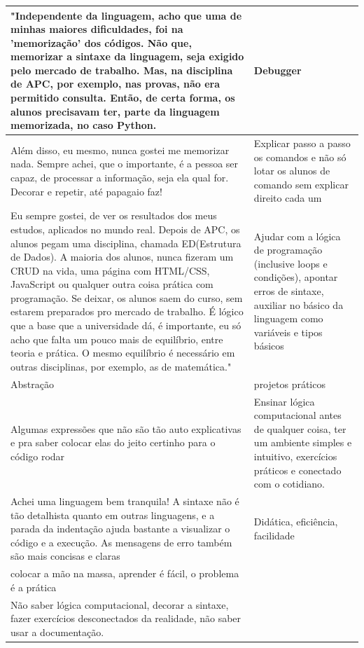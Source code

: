 \begin{longtable}{| p{} | p{} |}
    "Independente da linguagem, acho que uma de minhas maiores dificuldades, foi na 'memorização' dos códigos. Não que, memorizar a sintaxe da linguagem, seja exigido pelo mercado de trabalho. Mas, na disciplina de APC, por exemplo, nas provas, não era permitido consulta. Então, de certa forma, os alunos precisavam ter, parte da linguagem memorizada, no caso Python. & Debugger \\ \hline
    Além disso, eu mesmo, nunca gostei me memorizar nada. Sempre achei, que o importante, é a pessoa ser capaz, de processar a informação, seja ela qual for. Decorar e repetir, até papagaio faz! & Explicar passo a passo os comandos e não só lotar os alunos de comando sem explicar direito cada um \\ \hline
    Eu sempre gostei, de ver os resultados dos meus estudos, aplicados no mundo real. Depois de APC, os alunos pegam uma disciplina, chamada ED(Estrutura de Dados). A maioria dos alunos, nunca fizeram um CRUD na vida, uma página com HTML/CSS, JavaScript ou qualquer outra coisa prática com programação. Se deixar, os alunos saem do curso, sem estarem preparados pro mercado de trabalho. É lógico que a base que a universidade dá, é importante, eu só acho que falta um pouco mais de equilíbrio, entre teoria e prática. O mesmo equilíbrio é necessário em outras disciplinas, por exemplo, as de matemática." & Ajudar com a lógica de programação (inclusive loops e condições),  apontar erros de sintaxe, auxiliar no básico da linguagem como variáveis e tipos básicos \\ \hline
    Abstração & projetos práticos \\ \hline
    Algumas expressões que não são tão auto explicativas e pra saber colocar elas do jeito certinho para o código rodar & Ensinar lógica computacional antes de qualquer coisa, ter um ambiente simples e intuitivo, exercícios práticos e conectado com o cotidiano. \\ \hline
    Achei uma linguagem bem tranquila! A sintaxe não é tão detalhista quanto em outras linguagens, e a parada da indentação ajuda bastante a visualizar o código e a execução. As mensagens de erro também são mais concisas e claras & Didática, eficiência, facilidade \\ \hline
    colocar a mão na massa, aprender é fácil, o problema é a prática & ~ \\ \hline
    Não saber lógica computacional, decorar a sintaxe, fazer exercícios desconectados da realidade, não saber usar a documentação. & ~ \\ \hline

\end{longtable}

